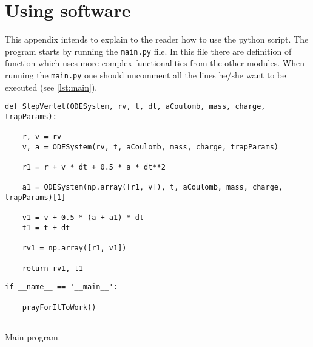 \chapter{Using software}

This appendix intends to explain to the reader how to use the python script. The program starts by running the \verb|main.py| file. In this file there are definition of function which uses more complex functionalities from the other modules. When running the \verb|main.py| one should uncomment all the lines he/she want to be executed (see \ref{lst:main}).


\begin{Verbatim}
def StepVerlet(ODESystem, rv, t, dt, aCoulomb, mass, charge, trapParams):

    r, v = rv
    v, a = ODESystem(rv, t, aCoulomb, mass, charge, trapParams)
    
    r1 = r + v * dt + 0.5 * a * dt**2
    
    a1 = ODESystem(np.array([r1, v]), t, aCoulomb, mass, charge, trapParams)[1]    
    
    v1 = v + 0.5 * (a + a1) * dt
    t1 = t + dt
    
    rv1 = np.array([r1, v1])
    
    return rv1, t1   
\end{Verbatim}


\begin{listing}
\begin{lstlisting}
if __name__ == '__main__':
    
    prayForItToWork()
	    
\end{lstlisting}
\caption{Main program.}
\label{lst:main}
\end{listing}


